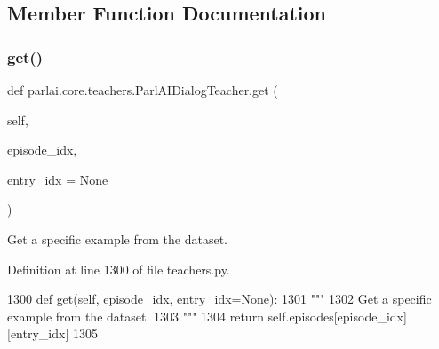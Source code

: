 \subsection{Member Function Documentation}
\mbox{\label{classparlai_1_1core_1_1teachers_1_1ParlAIDialogTeacher_a0ef5a3bbad31d95bc398a393ab0a310d}} 
\subsubsection{\texorpdfstring{get()}{get()}}
{\footnotesize\ttfamily def parlai.\+core.\+teachers.\+Parl\+A\+I\+Dialog\+Teacher.\+get (\begin{DoxyParamCaption}\item[{}]{self,  }\item[{}]{episode\+\_\+idx,  }\item[{}]{entry\+\_\+idx = {\ttfamily None} }\end{DoxyParamCaption})}

\begin{DoxyVerb}Get a specific example from the dataset.
\end{DoxyVerb}
 

Definition at line 1300 of file teachers.\+py.


\begin{DoxyCode}
1300     \textcolor{keyword}{def }get(self, episode\_idx, entry\_idx=None):
1301         \textcolor{stringliteral}{"""}
1302 \textcolor{stringliteral}{        Get a specific example from the dataset.}
1303 \textcolor{stringliteral}{        """}
1304         \textcolor{keywordflow}{return} self.episodes[episode\_idx][entry\_idx]
1305 
\end{DoxyCode}
\mbox{\label{classparlai_1_1core_1_1teachers_1_1ParlAIDialogTeacher_aee1494d5dd0610530b4b93e56010e6f8}} 
